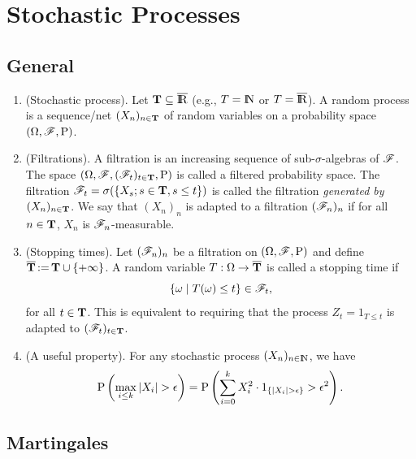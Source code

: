 \documentclass[a4paper,10pt]{article}
\begin{document}
\section{Stochastic Processes}
\subsection{General}
\begin{enumerate}
 \item (Stochastic process). Let $\T \subseteq \barre$ (e.g., $T=\N$ or $T=\barre$). A random process is 
       a sequence/net $(X_n)_{n\in \mathbf{T}}$ of random variables on a probability space $(\Omega,\mathscr{F},\mathrm{P})$.
       
 \item (Filtrations). A filtration is an increasing sequence of sub-$\sigma$-algebras of $\mathscr{F}$. The space 
       $(\Omega, \mathscr{F}, (\mathscr{F}_t)_{t\in \mathbf{T}}, \mathrm{P})$ is called a filtered probability space. The filtration 
       $\mathscr{F}_t = \sigma(\{X_s; s\in \mathbf{T}, s\leq t\})$ is called the filtration \textit{generated by $(X_n)_{n\in \mathbf{T}}$}.
       We say that $(X_n)_n$ is adapted to a filtration $(\mathscr{F}_n)_n$ if for all $n\in \mathbf{T}$, $X_n$ is $\mathscr{F}_n$-measurable.
       
 \item (Stopping times). Let $(\mathscr{F}_n)_n$ be a filtration on $(\Omega,\mathscr{F},\mathrm{P})$ and define $\overline{\mathbf{T}} {}\mathop{\mathrel{:}=}{} \mathbf{T} \cup \{+\infty\}$.
       A random variable $T: \Omega \to \overline{\mathbf{T}}$ is called a stopping time if
       \[
        \{\omega {}\mid{} T(\omega) \leq t\} \in \mathscr{F}_t,
       \]
      for all $t\in \mathbf{T}$. This is equivalent to requiring that the process $Z_t = 1_{T \leq t}$ is adapted to $(\mathscr{F}_t)_{t\in \mathbf{T}}$.
      
 \item (A useful property). For any stochastic process $(X_n)_{n\in\N}$, we have
 \[
  \prob\left(\max_{i\leq k}|X_i|>\epsilon\right) = \prob\left(\sum_{i=0}^{k}X_i^2 \cdot  1_{\{|X_i|>\epsilon\}}>\epsilon^2\right).
 \]

\end{enumerate}

\subsection{Martingales}
\end{document}
